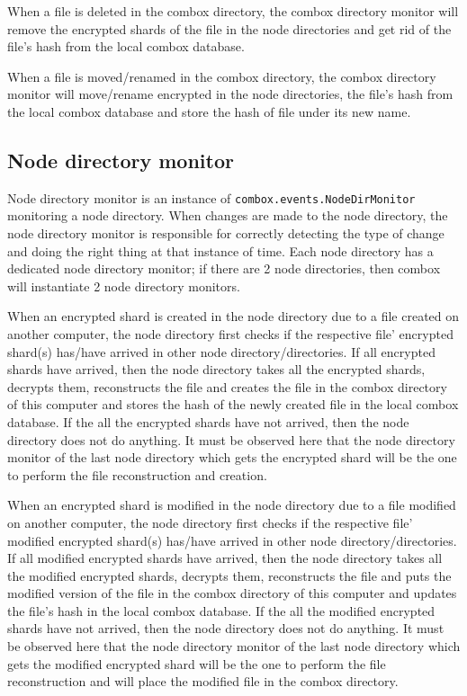 When a file is deleted in the combox directory, the combox directory
monitor will remove the encrypted shards of the file in the node
directories and get rid of the file's hash from the local combox
database.

When a file is moved/renamed in the combox directory, the combox
directory monitor will move/rename encrypted in the node directories,
the file's hash from the local combox database and store the hash of
file under its new name.

\subsection{Node directory monitor}\label{sec:3-combox-nodirm}

Node directory monitor is an instance of
\verb+combox.events.NodeDirMonitor+ monitoring a node directory. When
changes are made to the node directory, the node directory monitor is
responsible for correctly detecting the type of change and doing the
right thing at that instance of time. Each node directory has a
dedicated node directory monitor; if there are 2 node directories,
then combox will instantiate 2 node directory monitors.

When an encrypted shard is created in the node directory due to a file
created on another computer, the node directory first checks if the
respective file' encrypted shard(s) has/have arrived in other node
directory/directories. If all encrypted shards have arrived, then the
node directory takes all the encrypted shards, decrypts them,
reconstructs the file and creates the file in the combox directory of
this computer and stores the hash of the newly created file in the
local combox database. If the all the encrypted shards have not
arrived, then the node directory does not do anything. It must be
observed here that the node directory monitor of the last node
directory which gets the encrypted shard will be the one to perform
the file reconstruction and creation.

When an encrypted shard is modified in the node directory due to a
file modified on another computer, the node directory first checks if
the respective file' modified encrypted shard(s) has/have arrived in
other node directory/directories. If all modified encrypted shards
have arrived, then the node directory takes all the modified encrypted
shards, decrypts them, reconstructs the file and puts the modified
version of the file in the combox directory of this computer and
updates the file's hash in the local combox database. If the all the
modified encrypted shards have not arrived, then the node directory
does not do anything. It must be observed here that the node directory
monitor of the last node directory which gets the modified encrypted
shard will be the one to perform the file reconstruction and will place
the modified file in the combox directory.


